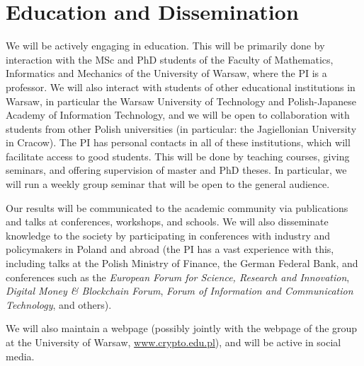 \documentclass{article}
\begin{document}
\section{Education and Dissemination}

We will be actively engaging in education. This will be primarily done by interaction with the MSc and PhD students of the Faculty of Mathematics, Informatics and Mechanics of the University of Warsaw, where the PI is a professor. We will also interact with students of other educational institutions in Warsaw, in particular the Warsaw University of Technology and Polish-Japanese Academy of Information Technology, and we will be open to collaboration with students from other Polish universities (in particular: the Jagiellonian University in Cracow). The PI has personal contacts in all of these institutions, which will facilitate access to good students. This will be done by teaching courses, giving seminars, and offering supervision of master and PhD theses. In particular, we will run a weekly group seminar that will be open to the general audience.

Our results will be communicated to the academic community via publications and talks at conferences, workshops, and schools. We will also disseminate knowledge to the society by participating in conferences with industry and policymakers in Poland and abroad (the PI has a vast experience with this, including talks at the Polish Ministry of Finance, the German Federal Bank, and conferences such as the \emph{European Forum for Science, Research and Innovation}, \emph{Digital Money \& Blockchain Forum}, \emph{Forum of Information and Communication Technology}, and others).

We will also maintain a webpage (possibly jointly with the webpage of the group at the University of Warsaw, \url{www.crypto.edu.pl}), and will be active in social media.




\printbibliography
\end{document}

